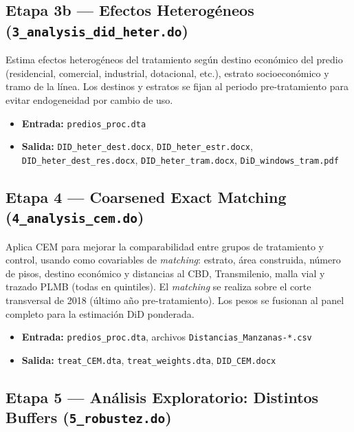 \documentclass[12pt, a4paper]{article}
\begin{document}
\subsection{Etapa 3b — Efectos Heterogéneos (\texttt{3\_analysis\_did\_heter.do})}

Estima efectos heterogéneos del tratamiento según destino económico del predio (residencial, comercial, industrial, dotacional, etc.), estrato socioeconómico y tramo de la línea. Los destinos y estratos se fijan al periodo pre-tratamiento para evitar endogeneidad por cambio de uso.

\begin{itemize}
  \item \textbf{Entrada:} \texttt{predios\_proc.dta}
  \item \textbf{Salida:} \texttt{DID\_heter\_dest.docx}, \texttt{DID\_heter\_estr.docx}, \texttt{DID\_heter\_dest\_res.docx}, \texttt{DID\_heter\_tram.docx}, \texttt{DiD\_windows\_tram.pdf}
\end{itemize}

\subsection{Etapa 4 — Coarsened Exact Matching (\texttt{4\_analysis\_cem.do})}

Aplica CEM para mejorar la comparabilidad entre grupos de tratamiento y control, usando como covariables de \textit{matching}: estrato, área construida, número de pisos, destino económico y distancias al CBD, Transmilenio, malla vial y trazado PLMB (todas en quintiles). El \textit{matching} se realiza sobre el corte transversal de 2018 (último año pre-tratamiento). Los pesos se fusionan al panel completo para la estimación DiD ponderada.

\begin{itemize}
  \item \textbf{Entrada:} \texttt{predios\_proc.dta}, archivos \texttt{Distancias\_Manzanas-*.csv}
  \item \textbf{Salida:} \texttt{treat\_CEM.dta}, \texttt{treat\_weights.dta}, \texttt{DID\_CEM.docx}
\end{itemize}

\subsection{Etapa 5 — Análisis Exploratorio: Distintos Buffers (\texttt{5\_robustez.do})}
\end{document}
